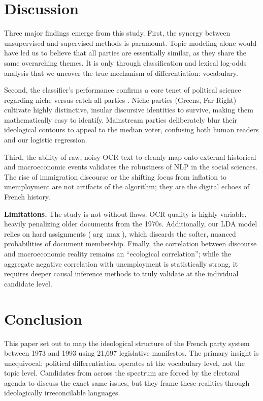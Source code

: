 \documentclass{article}
\begin{document}
\section{Discussion}

Three major findings emerge from this study. First, the synergy between unsupervised and supervised methods is paramount. Topic modeling alone would have led us to believe that all parties are essentially similar, as they share the same overarching themes. It is only through classification and lexical log-odds analysis that we uncover the true mechanism of differentiation: vocabulary. 

Second, the classifier's performance confirms a core tenet of political science regarding niche versus catch-all parties \citep{meguid2005competition}. Niche parties (Greens, Far-Right) cultivate highly distinctive, insular discursive identities to survive, making them mathematically easy to identify. Mainstream parties deliberately blur their ideological contours to appeal to the median voter, confusing both human readers and our logistic regression.

Third, the ability of raw, noisy OCR text to cleanly map onto external historical and macroeconomic events validates the robustness of NLP in the social sciences. The rise of immigration discourse or the shifting focus from inflation to unemployment are not artifacts of the algorithm; they are the digital echoes of French history.

\textbf{Limitations.} The study is not without flaws. OCR quality is highly variable, heavily penalizing older documents from the 1970s. Additionally, our LDA model relies on hard assignments ($\arg\max$), which discards the softer, nuanced probabilities of document membership. Finally, the correlation between discourse and macroeconomic reality remains an ``ecological correlation''; while the aggregate negative correlation with unemployment is statistically strong, it requires deeper causal inference methods to truly validate at the individual candidate level.

\section{Conclusion}

This paper set out to map the ideological structure of the French party system between 1973 and 1993 using 21,697 legislative manifestos. The primary insight is unequivocal: political differentiation operates at the vocabulary level, not the topic level. Candidates from across the spectrum are forced by the electoral agenda to discuss the exact same issues, but they frame these realities through ideologically irreconcilable languages. 
\end{document}
